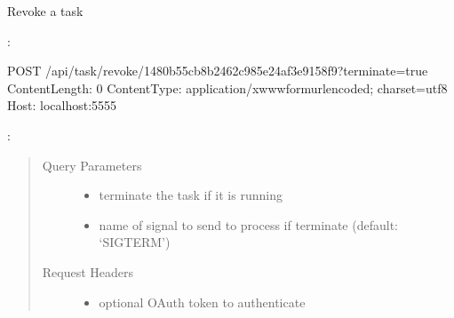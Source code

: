 \documentclass[letterpaper,10pt,english]{sphinxmanual}
\begin{document}
\begin{fulllineitems}
\label{\detokenize{api:post--api-task-revoke-(.+)}}
Revoke a task

:

\begin{sphinxVerbatim}[commandchars=\\\{\}]
POST /api/task/revoke/1480b55c\PYGZhy{}b8b2\PYGZhy{}462c\PYGZhy{}985e\PYGZhy{}24af3e9158f9?terminate=true
Content\PYGZhy{}Length: 0
Content\PYGZhy{}Type: application/x\PYGZhy{}www\PYGZhy{}form\PYGZhy{}urlencoded; charset=utf\PYGZhy{}8
Host: localhost:5555
\end{sphinxVerbatim}

:

\begin{sphinxVerbatim}[commandchars=\\\{\}]
  
 
 

     
\end{sphinxVerbatim}
\begin{quote}\begin{description}
\item[{Query Parameters}] \leavevmode\begin{itemize}
\item {} 
 \textendash{} terminate the task if it is running

\item {} 
 \textendash{} name of signal to send to process if terminate (default: ‘SIGTERM’)

\end{itemize}

\item[{Request Headers}] \leavevmode\begin{itemize}
\item {} 
 \textendash{} optional OAuth token to authenticate


\end{itemize}
\end{description}
\end{quote}
\end{fulllineitems}
\end{document}
